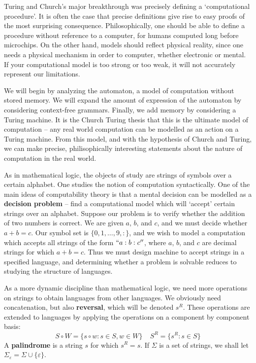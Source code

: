 Turing and Church's major breakthrough was precisely defining a `computational procedure'. It is often the case that precise definitions give rise to easy proofs of the most surprising consequence. Philosophically, one should be able to define a procedure without reference to a computer, for humans computed long before microchips. On the other hand, models should reflect physical reality, since one needs a physical mechanism in order to computer, whether electronic or mental. If your computational model is too strong or too weak, it will not accurately represent our limitations.

We will begin by analyzing the automaton, a model of computation without stored memory. We will expand the amount of expression of the automaton by considering context-free grammars. Finally, we add memory by considering a Turing machine. It is the Church Turing thesis that this is the ultimate model of computation -- any real world computation can be modelled as an action on a Turing machine. From this model, and with the hypothesis of Church and Turing, we can make precise, philisophically interesting statements about the nature of computation in the real world.

As in mathematical logic, the objects of study are strings of symbols over a certain alphabet. One studies the notion of computation syntactically. One of the main ideas of computability theory is that a mental decision can be modelled as a {\bf decision problem} -- find a computational model which will `accept' certain strings over an alphabet. Suppose our problem is to verify whether the addition of two numbers is correct. We are given $a$, $b$, and $c$, and we must decide whether $a + b = c$. Our symbol set is $\{ 0, 1, \dots, 9, : \}$, and we wish to model a computation which accepts all strings of the form $``a:b:c''$, where $a$, $b$, and $c$ are decimal strings for which $a + b = c$. Thus we must design machine to accept strings in a specified language, and determining whether a problem is solvable reduces to studying the structure of languages.

As a more dynamic discipline than mathematical logic, we need more operations on strings to obtain languages from other languages. We obviously need concatenation, but also {\bf reversal}, which will be denoted $s^R$. These operations are extended to languages by applying the operations on a component by component basis:
%
\[ S \circ W = \{ s \circ w : s \in S, w \in W \}\ \ \ \ \ S^R = \{ s^R : s \in S \} \]
%
A {\bf palindrome} is a string $s$ for which $s^R = s$. If $\Sigma$ is a set of strings, we shall let $\Sigma_\varepsilon = \Sigma \cup \{ \varepsilon \}$.



